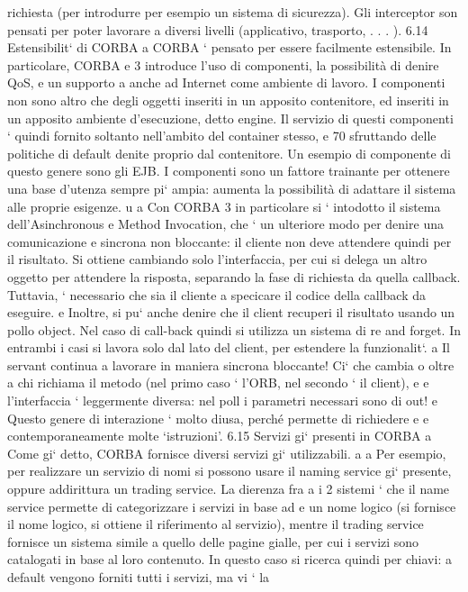 \documentclass[a4paper,12pt]{article}
\begin{document}
richiesta (per introdurre per esempio un sistema di sicurezza). Gli interceptor
son pensati per poter lavorare a diversi livelli (applicativo, trasporto, . . . ).
6.14
Estensibilit` di CORBA
a
CORBA ` pensato per essere facilmente estensibile. In particolare, CORBA
e
3 introduce l'uso di componenti, la possibilità di denire QoS, e un supporto
a
anche ad Internet come ambiente di lavoro.
I componenti non sono altro che degli oggetti inseriti in un apposito contenitore, ed inseriti in un apposito ambiente
d'esecuzione, detto engine. Il servizio
di questi componenti ` quindi fornito soltanto nell'ambito del container stesso,
e
70
sfruttando delle politiche di default denite proprio dal contenitore. Un esempio
di componente di questo genere sono gli EJB.
I componenti sono un fattore trainante per ottenere una base d'utenza sempre pi` ampia: aumenta la possibilità di
adattare il sistema alle proprie esigenze.
u
a
Con CORBA 3 in particolare si ` intodotto il sistema dell'Asinchronous
e
Method Invocation, che ` un ulteriore modo per denire una comunicazione
e
sincrona non bloccante: il cliente non deve attendere quindi per il risultato.
Si ottiene cambiando solo l'interfaccia, per cui si delega un altro oggetto per
attendere la risposta, separando la fase di richiesta da quella callback. Tuttavia,
` necessario che sia il cliente a specicare il codice della callback da eseguire.
e
Inoltre, si pu` anche denire che il client recuperi il risultato usando un pollo
object. Nel caso di call-back quindi si utilizza un sistema di re and forget. In
entrambi i casi si lavora solo dal lato del client, per estendere la funzionalit`.
a
Il servant continua a lavorare in maniera sincrona bloccante! Ci` che cambia
o
oltre a chi richiama il metodo (nel primo caso ` l'ORB, nel secondo ` il client),
e
e
l'interfaccia ` leggermente diversa: nel poll i parametri necessari sono di out!
e
Questo genere di interazione ` molto diusa, perché permette di richiedere
e
e
contemporaneamente molte {`}istruzioni'.
6.15
Servizi gi` presenti in CORBA
a
Come gi` detto, CORBA fornisce diversi servizi gi` utilizzabili.
a
a
Per esempio, per realizzare un servizio di nomi si possono usare il naming
service gi` presente, oppure addirittura un trading service. La dierenza fra
a
i 2 sistemi ` che il name service permette di categorizzare i servizi in base ad
e
un nome logico (si fornisce il nome logico, si ottiene il riferimento al servizio),
mentre il trading service fornisce un sistema simile a quello delle pagine gialle,
per cui i servizi sono catalogati in base al loro contenuto. In questo caso si
ricerca quindi per chiavi: a default vengono forniti tutti i servizi, ma vi ` la
\end{document}
